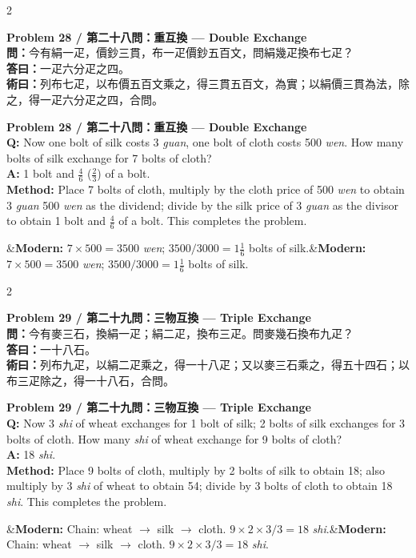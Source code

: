 \documentclass[11pt,a4paper]{article}
\newcommand{\bilingualproblem}[4]{%
  \begin{paracol}{2}
  \begin{leftcolumn}
  \noindent\textbf{\color{problemcolor}#1}\\[0.2cm]
  #2
  \end{leftcolumn}
  \switchcolumn
  \noindent\textbf{\color{problemcolor}#1}\\[0.2cm]
  #3
  \end{paracol}
  \ifx&#4&\else\vspace{0.3cm}\noindent#4\fi
  \vspace{0.5cm}
}
\newcommand{\wen}[1]{\textcolor{problemcolor}{\textbf{問：}}#1}
\newcommand{\da}[1]{\textcolor{answercolor}{\textbf{答曰：}}#1}
\newcommand{\shu}[1]{\textcolor{methodcolor}{\textbf{術曰：}}#1}
\newcommand{\wenen}[1]{\textcolor{problemcolor}{\textbf{Q:}} #1}
\newcommand{\daen}[1]{\textcolor{answercolor}{\textbf{A:}} #1}
\newcommand{\shuen}[1]{\textcolor{methodcolor}{\textbf{Method:}} #1}
\begin{document}
\bilingualproblem{Problem 28 / 第二十八問：重互換 --- Double Exchange}{
\wen{今有絹一疋，價鈔三貫，布一疋價鈔五百文，問絹幾疋換布七疋？}\\[0.2cm]
\da{一疋六分疋之四。}\\[0.2cm]
\shu{列布七疋，以布價五百文乘之，得三貫五百文，為實；以絹價三貫為法，除之，得一疋六分疋之四，合問。}
}{
\wenen{Now one bolt of silk costs 3 \textit{guan}, one bolt of cloth costs 500 \textit{wen}. How many bolts of silk exchange for 7 bolts of cloth?}\\[0.2cm]
\daen{1 bolt and $\frac{4}{6}$ ($\frac{2}{3}$) of a bolt.}\\[0.2cm]
\shuen{Place 7 bolts of cloth, multiply by the cloth price of 500 \textit{wen} to obtain 3 \textit{guan} 500 \textit{wen} as the dividend; divide by the silk price of 3 \textit{guan} as the divisor to obtain 1 bolt and $\frac{4}{6}$ of a bolt. This completes the problem.}
}{\textbf{Modern:} $7 \times 500 = 3500$ \textit{wen}; $3500 / 3000 = 1\frac{1}{6}$ bolts of silk.}

\bilingualproblem{Problem 29 / 第二十九問：三物互換 --- Triple Exchange}{
\wen{今有麥三石，換絹一疋；絹二疋，換布三疋。問麥幾石換布九疋？}\\[0.2cm]
\da{一十八石。}\\[0.2cm]
\shu{列布九疋，以絹二疋乘之，得一十八疋；又以麥三石乘之，得五十四石；以布三疋除之，得一十八石，合問。}
}{
\wenen{Now 3 \textit{shi} of wheat exchanges for 1 bolt of silk; 2 bolts of silk exchanges for 3 bolts of cloth. How many \textit{shi} of wheat exchange for 9 bolts of cloth?}\\[0.2cm]
\daen{18 \textit{shi}.}\\[0.2cm]
\shuen{Place 9 bolts of cloth, multiply by 2 bolts of silk to obtain 18; also multiply by 3 \textit{shi} of wheat to obtain 54; divide by 3 bolts of cloth to obtain 18 \textit{shi}. This completes the problem.}
}{\textbf{Modern:} Chain: wheat $\to$ silk $\to$ cloth. $9 \times 2 \times 3 / 3 = 18$ \textit{shi}.}

\newpage
\end{document}
